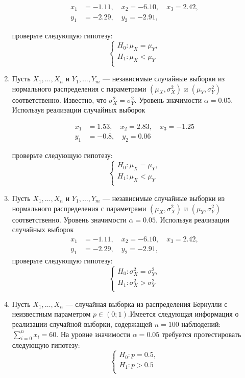 \begin{enumerate}
\begin{align*}
x_{1} &= -1.11, \quad x_{2} = -6.10, \quad x_{3} = 2.42, \\
y_{1} &= -2.29, \quad y_{2} = -2.91,
\end{align*}

проверьте следующую гипотезу:
\[
\begin{cases}
H_{0}:\mu_{X} = \mu_{Y}, \\
H_{1}:\mu_{X} < \mu_{Y} \\
\end{cases}
\]

\item Пусть $X_{1}, \ldots, X_{n}$ и $Y_{1}, \ldots, Y_{m}$ — независимые случайные
выборки из нормального распределения с параметрами $(\mu_{X},\sigma^2_{X})$ и
$(\mu_{Y},\sigma^2_{Y})$ соответственно.
Известно, что $\sigma^2_{X} = \sigma^2_{Y}$.
Уровень значимости $\alpha = 0.05$. Используя реализации случайных выборок

\begin{align*}
x_{1} &= 1.53, \quad x_{2} = 2.83, \quad x_{3} = -1.25 \\
y_{1} &= -0.8, \quad y_{2} = 0.06
\end{align*}

проверьте следующую гипотезу:
\[
\begin{cases}
H_{0}:\mu_{X} = \mu_{Y}, \\
H_{1}:\mu_{X} < \mu_{Y} \\
\end{cases}
\]

\item Пусть $X_{1}, \ldots, X_{n}$ и $Y_{1}, \ldots, Y_{m}$ — независимые случайные
выборки из нормального распределения с параметрами $(\mu_{X},\sigma^2_{X})$ и
$(\mu_{Y},\sigma^2_{Y})$ соответственно.
Уровень значимости $\alpha = 0.05$.
Используя реализации случайных выборок\newline
\begin{align*}
x_{1} &= -1.11, \quad x_{2} = -6.10, \quad x_{3} = 2.42, \\
y_{1} &= -2.29, \quad y_{2} = -2.91,
\end{align*}
проверьте следующую гипотезу:
\[
\begin{cases}
H_{0}:\sigma^2_{X} = \sigma^2_{Y}, \\
H_{1}:\sigma^2_{X} > \sigma^2_{Y} \\
\end{cases}
\]

\item Пусть  $X_{1}, \ldots, X_{n}$ — случайная выборка из распределения Бернулли с
неизвестным параметром $p \in (0;1)$.Имеется следующая информация о реализации
случайной выборки, содержащей $n = 100$ наблюдений: $\sum_{i=0}^{n} x_{i} = 60$.
На уровне значимости $\alpha = 0.05$ требуется протестировать следующую гипотезу:
\[
\begin{cases}
H_{0}:p = 0.5, \\
H_{1}:p > 0.5 \\
\end{cases}
\]


\end{enumerate}
